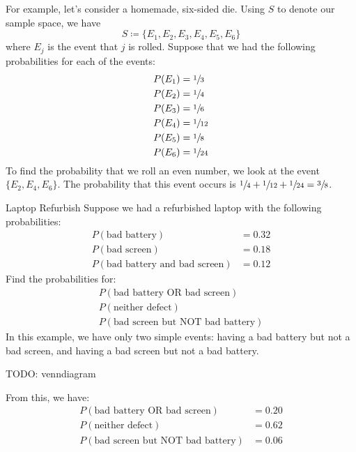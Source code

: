 For example, let's consider a homemade, six-sided die. Using $S$ to denote our sample space, we have
\[ S \coloneq \{ E_1, E_2, E_3, E_4, E_5, E_6 \} \]
where $E_j$ is the event that $j$ is rolled. Suppose that we had the following probabilities for each of the events:
\begin{align*}
    P(E_1) &= \sfrac13 \\
    P(E_2) &= \sfrac14 \\
    P(E_3) &= \sfrac16 \\
    P(E_4) &= \sfrac{1}{12} \\
    P(E_5) &= \sfrac18 \\
    P(E_6) &= \sfrac{1}{24}
\end{align*}
To find the probability that we roll an even number, we look at the event $\{E_2, E_4, E_6\}$. The probability that this event occurs is $\sfrac{1}{4} + \sfrac{1}{12} + \sfrac{1}{24} = \sfrac{3}{8}$. 

\begin{exbox}{Laptop Refurbish}{}
    Suppose we had a refurbished laptop with the following probabilities:
    \begin{align*}
        P(\text{bad battery}) &= 0.32 \\
        P(\text{bad screen}) &= 0.18 \\
        P(\text{bad battery and bad screen}) &= 0.12
    \end{align*}
    Find the probabilities for:
    \begin{align*}
        P(\text{bad battery OR bad screen}) \\
        P(\text{neither defect}) \\
        P(\text{bad screen but NOT bad battery})
    \end{align*}
    \tcblower
    In this example, we have only two simple events: having a bad battery but not a bad screen, and having a bad screen but not a bad battery.

    TODO: venndiagram

    From this, we have:
    \begin{align*}
        P(\text{bad battery OR bad screen}) &= 0.20 \\
        P(\text{neither defect}) &= 0.62 \\
        P(\text{bad screen but NOT bad battery}) &= 0.06
    \end{align*}
\end{exbox}

